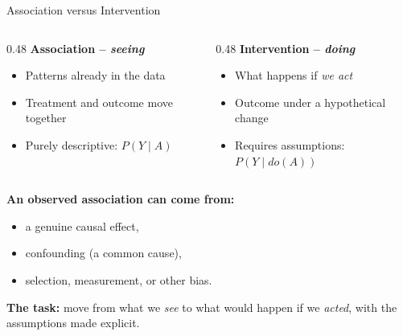 \documentclass[aspectratio=169]{beamer}
\begin{document}
\begin{frame}{Association versus Intervention}
  \small
  \begin{columns}[T]
    \begin{column}{0.48\textwidth}
      \textbf{Association \;--\; \emph{seeing}}
      \begin{itemize}
        \item Patterns already in the data
        \item Treatment and outcome move together
        \item Purely descriptive: $P(Y \mid A)$
      \end{itemize}
    \end{column}
    \begin{column}{0.48\textwidth}
      \textbf{Intervention \;--\; \emph{doing}}
      \begin{itemize}
        \item What happens if \emph{we act}
        \item Outcome under a hypothetical change
        \item Requires assumptions: $P(Y \mid do(A))$
      \end{itemize}
    \end{column}
  \end{columns}
  \vspace{1em}

  \textbf{An observed association can come from:}
  \begin{itemize}
    \item a genuine causal effect,
    \item confounding (a common cause),
    \item selection, measurement, or other bias.
  \end{itemize}
  \vspace{0.6em}

  \textcolor{accent}{\textbf{The task:}} move from what we \emph{see} to what would happen if we \emph{acted}, with the assumptions made explicit.
\end{frame}
\end{document}
